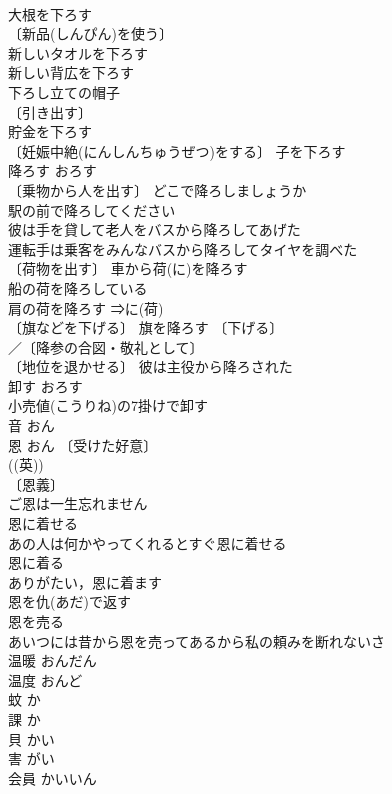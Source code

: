 \documentclass[8pt]{extreport}
\begin{document}
\begin{CJK}{UTF8}{min}
\\	大根を下ろす 
\\	〔新品(しんぴん)を使う〕 
\\	新しいタオルを下ろす 
\\	新しい背広を下ろす 
\\	下ろし立ての帽子 
\\	〔引き出す〕 
\\	貯金を下ろす 
\\	〔妊娠中絶(にんしんちゅうぜつ)をする〕 子を下ろす 
\\	降ろす	おろす	
\\	〔乗物から人を出す〕 どこで降ろしましょうか 
\\	駅の前で降ろしてください 
\\	彼は手を貸して老人をバスから降ろしてあげた 
\\	運転手は乗客をみんなバスから降ろしてタイヤを調べた 
\\	〔荷物を出す〕 車から荷(に)を降ろす 
\\	船の荷を降ろしている 
\\	肩の荷を降ろす ⇒に(荷) 
\\	〔旗などを下げる〕 旗を降ろす 〔下げる〕
\\	／〔降参の合図・敬礼として〕
\\	〔地位を退かせる〕 彼は主役から降ろされた 
\\	卸す	おろす	
\\	小売値(こうりね)の7掛けで卸す 
\\	音	おん	
\\	恩	おん	〔受けた好意〕
\\	((英)) 
\\	〔恩義〕
\\	ご恩は一生忘れません 
\\	恩に着せる 
\\	あの人は何かやってくれるとすぐ恩に着せる 
\\	恩に着る 
\\	ありがたい，恩に着ます 
\\	恩を仇(あだ)で返す 
\\	恩を売る 
\\	あいつには昔から恩を売ってあるから私の頼みを断れないさ 
\\	温暖	おんだん	
\\	温度	おんど	
\\	蚊	か	
\\	課	か	
\\	貝	かい	
\\	害	がい	
\\	会員	かいいん	

\end{CJK}
\end{document}

